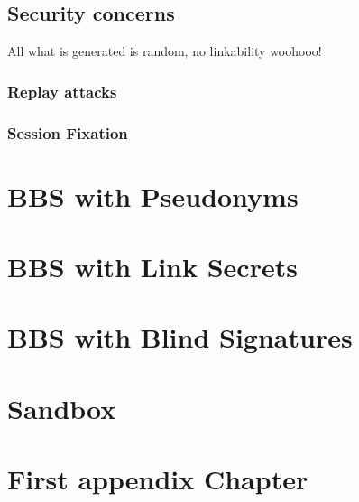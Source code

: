 \documentclass[
	a4paper               %
	,BCOR=0mm            %
	,bibliography=totoc   %
	,listof=totoc         %
	,monolingual
	,twoside=false
]{bfhthesis}              %
\begin{document}
\section{Security concerns}
All what is generated is random, no linkability woohooo!

\subsection{Replay attacks}

\subsection{Session Fixation}


\chapter{BBS with Pseudonyms}
\label{chap:Pseudonyms}

\chapter{BBS with Link Secrets}
\label{chap:linksecrets}

\chapter{BBS with Blind Signatures}
\label{chap:blindsignatures}


\chapter{Sandbox}

\appendix


\chapter{First appendix Chapter}



\end{document}
